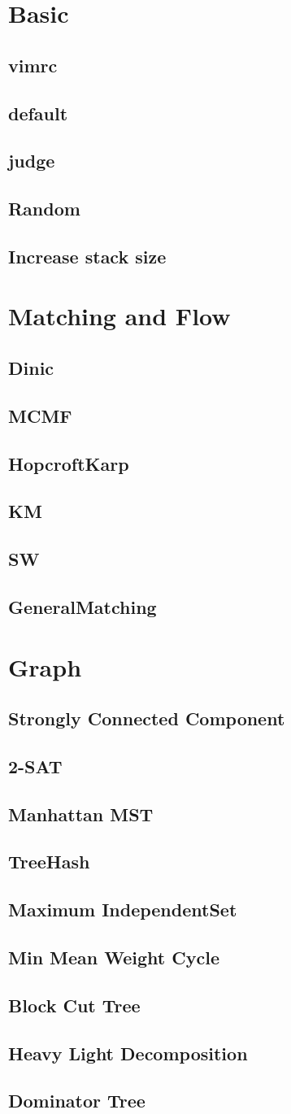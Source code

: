 \documentclass[a4paper,10pt,twocolumn,oneside]{article}
\begin{document}
\pagestyle{fancy}
\fancyfoot{}
\fancyhead[R]{\thepage}
\renewcommand{\headrulewidth}{0.4pt}
\renewcommand{\contentsname}{Contents} 

\scriptsize
\vspace{-2em}
\tableofcontents
\vspace{-1em}



\newcommand{\includecode}[2]{
  \subsection{#1}
  \vspace{-0.8em}
  
  \vspace{-1.2em}
}

\newcommand{\includetex}[2]{
  \subsection{#1}
  
  \vspace{-1.2em}
}

\newcommand{\sectiontitle}[1]{
  \section{#1}
  \vspace{-0.5em}
}



\sectiontitle{Basic}
\includecode{vimrc}{../code/Basic/vimrc}
\includecode{default}{../code/Basic/default.cpp}
\includecode{judge}{../code/Basic/judge.sh}
\includecode{Random}{../code/Basic/Random.cpp}
\includecode{Increase stack size}{../code/Basic/IncStack.txt}

\sectiontitle{Matching and Flow}
\includecode{Dinic}{../code/Flow/Dinic.cpp}
\includecode{MCMF}{../code/Flow/MCMF.cpp}
\includecode{HopcroftKarp}{../code/Flow/HopcroftKarp.cpp}
\includecode{KM}{../code/Flow/KM.cpp}
\includecode{SW}{../code/Flow/SW.cpp}
\includecode{GeneralMatching}{../code/Flow/GeneralMatching.cpp}

\sectiontitle{Graph}
\includecode{Strongly Connected Component}{../code/Graph/StronglyConnectedComponent.cpp}
\includecode{2-SAT}{../code/Graph/TwoSAT.cpp}
\includecode{Manhattan MST}{../code/Graph/ManhattanMST.cpp}
\includecode{TreeHash}{../code/Graph/TreeHash.cpp}
\includecode{Maximum IndependentSet}{../code/Graph/MaximumIndependentSet.cpp}
\includecode{Min Mean Weight Cycle}{../code/Graph/MinMeanWeightCycle.cpp}
\includecode{Block Cut Tree}{../code/Graph/BlockCutTree.cpp}
\includecode{Heavy Light Decomposition}{../code/Graph/HeavyLightDecomposition.cpp}
\includecode{Dominator Tree}{../code/Graph/DominatorTree.cpp}
\end{document}
